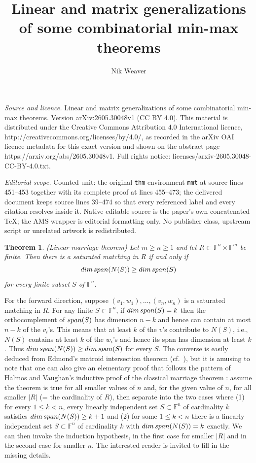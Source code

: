 \documentclass[10pt,a4paper]{amsart}
\newtheorem{thm}{Theorem}[section]
\begin{document}
\title[Linear and matrix generalizations of some combinatorial min-]{Linear and matrix generalizations of some combinatorial min-max theorems}
\author{Nik Weaver}
\date{}
\maketitle
\noindent\emph{Source and licence.} Linear and matrix generalizations of some combinatorial min-max theorems. Version arXiv:2605.30048v1 (CC BY 4.0). This material is distributed under the Creative Commons Attribution 4.0 International licence, http://creativecommons.org/licenses/by/4.0/, as recorded in the arXiv OAI licence metadata for this exact version and shown on the abstract page https://arxiv.org/abs/2605.30048v1. Full rights notice: licenses/arxiv-2605.30048-CC-BY-4.0.txt.\par\smallskip
\noindent\textit{Editorial scope.} Counted unit: the original \texttt{thm} environment \texttt{mmt} at source lines 451--453 together with its complete proof at lines 455--473; the delivered document keeps source lines 39--474 so that every referenced label and every citation resolves inside it. Native editable source is the paper's own concatenated TeX; the AMS wrapper is editorial formatting only. No publisher class, upstream script or unrelated artwork is redistributed.
\begin{thm}\label{qhmt} (Linear marriage theorem)
Let $m \geq n \geq 1$ and let $R \subset \mathbb{F}^n \times \mathbb{F}^m$ be finite. Then there is a saturated matching in $R$ if and only if $${\rm dim}\, {\rm span}(N(S)) \geq {\rm dim}\, {\rm span}(S)$$ for every finite subset $S$ of $\mathbb{F}^n$.
\end{thm}

For the forward direction, suppose $(v_1, w_1), \ldots, (v_n,w_n)$ is a saturated matching in $R$. For any finite $S \subset \mathbb{F}^n$, if ${\rm dim}\, {\rm span}(S) = k$ then the orthocomplement of ${\rm span}(S)$ has dimension $n - k$ and hence can contain at most $n - k$ of the $v_i$'s. This means that at least $k$ of the $v$'s contribute to $N(S)$, i.e., $N(S)$ contains at least $k$ of the $w_i$'s and hence its span has dimension at least $k$. Thus ${\rm dim}\, {\rm span}(N(S)) \geq {\rm dim}\, {\rm span}(S)$ for every $S$. The converse is easily deduced from Edmond's matroid intersection theorem \cite[Theorem (69)]{edmonds} (cf.\ \cite[Theorem 1*]{lovasz}), but it is amusing to note that one can also give an elementary proof that follows the pattern of Halmos and Vaughan's inductive proof of the classical marriage theorem \cite{HV}: assume the theorem is true for all smaller values of $n$ and, for the given value of $n$, for all smaller $|R|$ (= the cardinality of $R$), then separate into the two cases where (1) for every $1 \leq k < n$, every linearly independent set $S \subset \mathbb{F}^n$ of cardinality $k$ satisfies ${\rm dim}\, {\rm span}(N(S)) \geq k + 1$ and (2) for some $1 \leq k < n$ there is a linearly independent set $S \subset \mathbb{F}^n$ of cardinality $k$ with ${\rm dim}\, {\rm span}(N(S)) = k$ exactly. We can then invoke the induction hypothesis, in the first case for smaller $|R|$ and in the second case for smaller $n$. The interested reader is invited to fill in the missing details.
\end{document}
